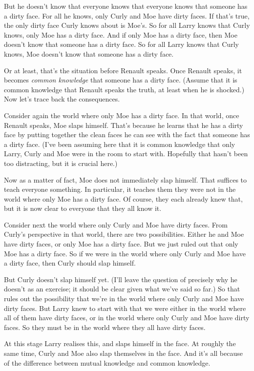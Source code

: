 But he doesn't know that everyone knows that everyone knows that someone has a dirty face. For all he knows, only Curly and Moe have dirty faces. If that's true, the only dirty face Curly knows about is Moe's. So for all Larry knows that Curly knows, only Moe has a dirty face. And if only Moe has a dirty face, then Moe doesn't know that someone has a dirty face. So for all Larry knows that Curly knows, Moe doesn't know that someone has a dirty face.

Or at least, that's the situation before Renault speaks. Once Renault speaks, it becomes \textit{common knowledge} that someone has a dirty face. (Assume that it is common knowledge that Renault speaks the truth, at least when he is shocked.) Now let's trace back the consequences.

Consider again the world where only Moe has a dirty face. In that world, once Renault speaks, Moe slaps himself. That's because he learns that he has a dirty face by putting together the clean faces he can see with the fact that someone has a dirty face. (I've been assuming here that it is common knowledge that only Larry, Curly and Moe were in the room to start with. Hopefully that hasn't been too distracting, but it is crucial here.) 

Now as a matter of fact, Moe does not immediately slap himself. That suffices to teach everyone something. In particular, it teaches them they were not in the world where only Moe has a dirty face. Of course, they each already knew that, but it is now clear to everyone that they all know it. 

Consider next the world where only Curly and Moe have dirty faces. From Curly's perspective in that world, there are two possibilities. Either he and Moe have dirty faces, or only Moe has a dirty face. But we just ruled out that only Moe has a dirty face. So if we were in the world where only Curly and Moe have a dirty face, then Curly should slap himself.

But Curly doesn't slap himself yet. (I'll leave the question of precisely why he doesn't as an exercise; it should be clear given what we've said so far.) So that rules out the possibility that we're in the world where only Curly and Moe have dirty faces. But Larry knew to start with that we were either in the world where all of them have dirty faces, or in the world where only Curly and Moe have dirty faces. So they must be in the world where they all have dirty faces.

At this stage Larry realises this, and slaps himself in the face. At roughly the same time, Curly and Moe also slap themselves in the face. And it's all because of the difference between mutual knowledge and common knowledge.

